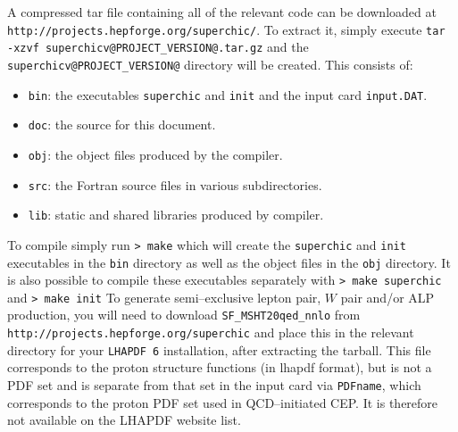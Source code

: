 \documentclass[12pt]{article}
\begin{document}
A compressed tar file containing all of the relevant code can be 
downloaded at \texttt{http://projects.hepforge.org/superchic/}. To 
extract it, simply execute \texttt{tar -xzvf 
superchicv@PROJECT_VERSION@.tar.gz} and the 
\texttt{superchicv@PROJECT_VERSION@} directory will be created. 
This consists of:
%
\begin{itemize}
\item \texttt{bin}: the executables \texttt{superchic} and \texttt{init} 
and the input card \texttt{input.DAT}.
\item \texttt{doc}: the source for this document.
\item \texttt{obj}: the object files produced by the compiler.
\item \texttt{src}: the Fortran source files in various subdirectories.
\item \texttt{lib}: static and shared libraries produced by compiler.
\end{itemize}
%
To compile simply run
\newline
\newline
\texttt{> make}
\newline
\newline
which will create the \texttt{superchic} and \texttt{init} executables 
in the \texttt{bin} directory as well as the object files in the 
\texttt{obj} directory. It is also possible to compile these 
executables separately with
\newline
\newline
\texttt{> make superchic}
\newline
\newline
and
\newline
\newline
\texttt{> make init}
\newline
\newline
To generate semi--exclusive lepton pair, $W$ pair and/or ALP production, 
you will need to download \texttt{SF\_MSHT20qed\_nnlo} from 
\texttt{http://projects.hepforge.org/superchic} and place this in the 
relevant directory for your \texttt{LHAPDF 6} installation, after 
extracting the tarball. This file corresponds to the proton structure 
functions (in lhapdf format), but is not a PDF set and is separate from 
that set in the input card via \texttt{PDFname}, which corresponds to 
the proton PDF set used in QCD--initiated CEP. It is therefore not 
available on the LHAPDF website list.
\end{document}
